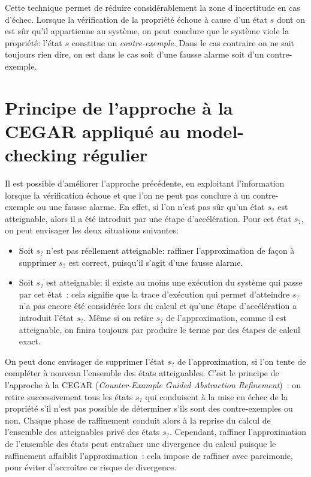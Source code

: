 Cette technique permet de réduire considérablement la zone d'incertitude en cas d'échec.
Lorsque la vérification de la propriété échoue à cause d'un état $s$ dont on est sûr
qu'il appartienne au système, on peut conclure que le système viole la propriété:
l'état $s$ constitue un \emph{contre-exemple}. Dans le cas contraire on ne sait toujours rien dire,
on est  dans le cas soit d'une fausse alarme soit d'un contre-exemple.

\section{Principe de l'approche à la {CEGAR} appliqué au model-checking régulier}

Il est possible d'améliorer l'approche précédente, en exploitant l'information
lorsque la vérification échoue et que l'on ne peut pas conclure à un contre-exemple ou une fausse alarme.
En effet, si l'on n'est pas sûr qu'un état $s_?$ est atteignable, alors il a été introduit par une étape d'accélération.
Pour cet état $s_?$, on peut envisager les deux situations suivantes:

\begin{itemize}
\item
  Soit $s_?$ n'est pas réellement atteignable: raffiner l'approximation de façon
  à supprimer $s_?$ est correct, puisqu'il s'agit d'une fausse alarme.
\item
  Soit $s_?$ est atteignable: il existe au moins une exécution du système qui passe par cet état~:
  cela signifie que la trace d'exécution qui permet d'atteindre $s_?$ n'a pas encore été considérée
  lors du calcul et qu'une étape d'accélération a introduit l'état $s_?$.
  Même si on retire $s_?$ de l'approximation, comme il est atteignable, on finira toujours
  par produire le terme par des étapes de calcul exact. 
\end{itemize}
On peut donc envisager de supprimer l'état $s_?$ de l'approximation, si l'on tente de compléter à nouveau
l'ensemble des états atteignables. C'est le principe de l'approche à la {CEGAR}
(\emph{Counter-Example Guided Abstraction Refinement})~\cite{DBLP:conf/time/Clarke03}: on retire successivement tous les
états $s_?$ qui conduisent à la mise en échec de la propriété s'il n'est pas possible
de déterminer s'ils sont des contre-exemples ou non. Chaque phase de raffinement conduit 
alors à la reprise du calcul de l'ensemble des atteignables privé des états $s_?$.
Cependant, raffiner l'approximation de l'ensemble des états peut entraîner une divergence du calcul
puisque le raffinement affaiblit l'approximation~: cela impose de raffiner avec parcimonie, pour
éviter d'accroître ce risque de divergence.


